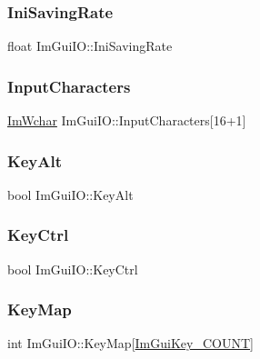 \subsubsection{\texorpdfstring{Ini\+Saving\+Rate}{IniSavingRate}}
{\footnotesize\ttfamily float Im\+Gui\+I\+O\+::\+Ini\+Saving\+Rate}

\mbox{\label{struct_im_gui_i_o_af6283418a2bff9db1522a6245476c7ed}} 
\subsubsection{\texorpdfstring{Input\+Characters}{InputCharacters}}
{\footnotesize\ttfamily \mbox{\hyperlink{imgui_8h_af2c7badaf05a0008e15ef76d40875e97}{Im\+Wchar}} Im\+Gui\+I\+O\+::\+Input\+Characters\mbox{[}16+1\mbox{]}}

\mbox{\label{struct_im_gui_i_o_a1e64ef08a4448a2cac874496130992cb}} 
\subsubsection{\texorpdfstring{Key\+Alt}{KeyAlt}}
{\footnotesize\ttfamily bool Im\+Gui\+I\+O\+::\+Key\+Alt}

\mbox{\label{struct_im_gui_i_o_a51de8f65dcabb80ef4e0d3c759ffcd7f}} 
\subsubsection{\texorpdfstring{Key\+Ctrl}{KeyCtrl}}
{\footnotesize\ttfamily bool Im\+Gui\+I\+O\+::\+Key\+Ctrl}

\mbox{\label{struct_im_gui_i_o_aa1cd0083960f8e5361eb6d49973c8823}} 
\subsubsection{\texorpdfstring{Key\+Map}{KeyMap}}
{\footnotesize\ttfamily int Im\+Gui\+I\+O\+::\+Key\+Map\mbox{[}\mbox{\hyperlink{imgui_8h_a683cc5d09c63d74035a98ac3b0dec545aec3107a9dcdc5632cdcd57d4f8bbed18}{Im\+Gui\+Key\+\_\+\+C\+O\+U\+NT}}\mbox{]}}

